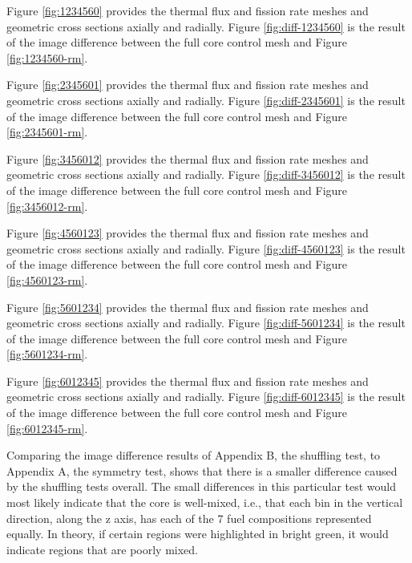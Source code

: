 


Figure \ref{fig:1234560} provides the thermal flux and fission rate meshes and geometric cross sections axially and radially.  Figure \ref{fig:diff-1234560} is the result of the image difference between the full core control mesh and Figure \ref{fig:1234560-rm}.




Figure \ref{fig:2345601} provides the thermal flux and fission rate meshes and geometric cross sections axially and radially.  Figure \ref{fig:diff-2345601} is the result of the image difference between the full core control mesh and Figure \ref{fig:2345601-rm}.




Figure \ref{fig:3456012} provides the thermal flux and fission rate meshes and geometric cross sections axially and radially.  Figure \ref{fig:diff-3456012} is the result of the image difference between the full core control mesh and Figure \ref{fig:3456012-rm}.




Figure \ref{fig:4560123} provides the thermal flux and fission rate meshes and geometric cross sections axially and radially.  Figure \ref{fig:diff-4560123} is the result of the image difference between the full core control mesh and Figure \ref{fig:4560123-rm}.




Figure \ref{fig:5601234} provides the thermal flux and fission rate meshes and geometric cross sections axially and radially.  Figure \ref{fig:diff-5601234} is the result of the image difference between the full core control mesh and Figure \ref{fig:5601234-rm}.




Figure \ref{fig:6012345} provides the thermal flux and fission rate meshes and geometric cross sections axially and radially.  Figure \ref{fig:diff-6012345} is the result of the image difference between the full core control mesh and Figure \ref{fig:6012345-rm}.

Comparing the image difference results of Appendix B, the shuffling test, to Appendix A, the symmetry test, shows that there is a smaller difference caused by the shuffling tests overall.  The small differences in this particular test would most likely indicate that the core is well-mixed, i.e., that each bin in the vertical direction, along the z axis, has each of the 7 fuel compositions represented equally.  In theory, if certain regions were highlighted in bright green, it would indicate regions that are poorly mixed.